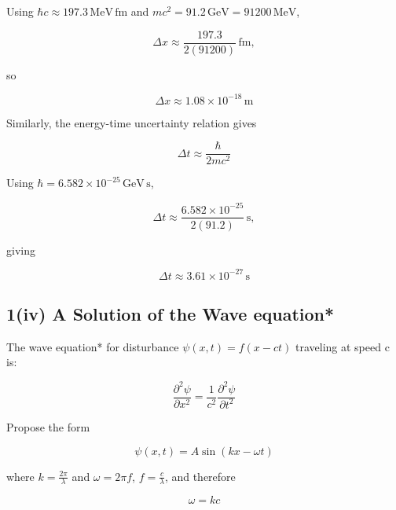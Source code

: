 \documentclass{article}
\begin{document}
Using $\hbar c\approx197.3\,\mathrm{MeV\,fm}$ and $mc^2=91.2\,\mathrm{GeV}=91200\,\mathrm{MeV}$,

\begin{equation*}
\Delta x \approx \frac{197.3}{2(91200)}\,\mathrm{fm},
\end{equation*}

so

\begin{equation*}
\boxed{\Delta x \approx 1.08 \times 10^{-18}\,\mathrm{m}}
\end{equation*}

Similarly, the energy-time uncertainty relation gives

\begin{equation*}
\Delta t \approx \frac{\hbar}{2mc^2}
\end{equation*}

Using $\hbar=6.582\times10^{-25}\,\mathrm{GeV\,s}$,

\begin{equation*}
\Delta t \approx \frac{6.582 \times 10^{-25}}{2(91.2)}\,\mathrm{s},
\end{equation*}

giving

\begin{equation*}
\boxed{\Delta t \approx 3.61 \times 10^{-27}\,\mathrm{s}}
\end{equation*}


\subsection*{1(iv) A Solution of the Wave equation*}

The wave equation* for disturbance $\psi(x,t) = f(x-ct)$ traveling at speed c is:

\begin{equation*}
\frac{\partial^2\psi}{\partial x^2} = \frac{1}{c^2} \frac{\partial^2\psi}{\partial t^2}
\end{equation*}

Propose the form

\begin{equation*}
\psi(x,t) = A\sin{(kx-\omega t)}
\end{equation*}

where $k=\frac{2\pi}{\lambda}$ and $\omega = 2\pi f$, $f=\frac{c}{\lambda}$, and therefore

\begin{equation*}
\omega = kc
\end{equation*}
\end{document}
